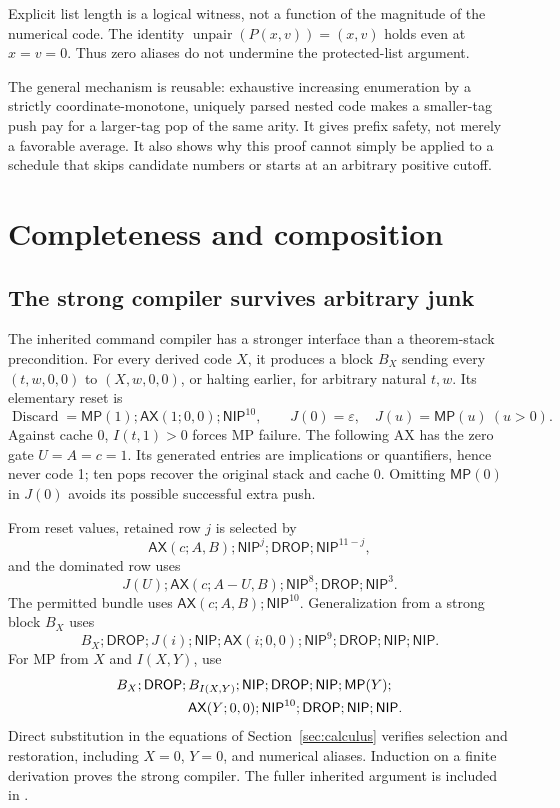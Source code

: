 \documentclass[11pt,a4paper]{article}
\theoremstyle{remark}\newtheorem{remark}[theorem]{Remark}
\newcommand{\D}{\mathsf{DROP}}
\newcommand{\N}{\mathsf{NIP}}
\newcommand{\MP}{\mathsf{MP}}
\newcommand{\AX}{\mathsf{AX}}
\newcommand{\file}[1]{\texttt{\path{#1}}}
\begin{document}
Explicit list length is a logical witness, not a function of the magnitude of the numerical code. The identity $\operatorname{unpair}(P(x,v))=(x,v)$ holds even at $x=v=0$. Thus zero aliases do not undermine the protected-list argument.

The general mechanism is reusable: exhaustive increasing enumeration by a strictly coordinate-monotone, uniquely parsed nested code makes a smaller-tag push pay for a larger-tag pop of the same arity. It gives prefix safety, not merely a favorable average. It also shows why this proof cannot simply be applied to a schedule that skips candidate numbers or starts at an arbitrary positive cutoff.

\section{Completeness and composition}\label{sec:complete}

\subsection{The strong compiler survives arbitrary junk}

The inherited command compiler has a stronger interface than a theorem-stack precondition. For every derived code $X$, it produces a block $B_X$ sending every $(t,w,0,0)$ to $(X,w,0,0)$, or halting earlier, for arbitrary natural $t,w$. Its elementary reset is
\[
 \operatorname{Discard}=\MP(1);\AX(1;0,0);\N^{10},
 \qquad J(0)=\varepsilon,\quad J(u)=\MP(u)\ (u>0).
\]
Against cache 0, $I(t,1)>0$ forces MP failure. The following AX has the zero gate $U=A=c=1$. Its generated entries are implications or quantifiers, hence never code 1; ten pops recover the original stack and cache 0. Omitting $\MP(0)$ in $J(0)$ avoids its possible successful extra push.

From reset values, retained row $j$ is selected by
\[
 \AX(c;A,B);\N^j;\D;\N^{11-j},
\]
and the dominated row uses
\[
 J(U);\AX(c;A-U,B);\N^8;\D;\N^3.
\]
The permitted bundle uses $\AX(c;A,B);\N^{10}$. Generalization from a strong block $B_X$ uses
\[
 B_X;\D;J(i);\N;\AX(i;0,0);\N^9;\D;\N;\N.
\]
For MP from $X$ and $I(X,Y)$, use
\begin{align*}
 &B_X;\D;B_{I(X,Y)};\N;\D;\N;\MP(Y);\\
 &\hspace{18mm}\AX(Y;0,0);\N^{10};\D;\N;\N.
\end{align*}
Direct substitution in the equations of Section~\ref{sec:calculus} verifies selection and restoration, including $X=0$, $Y=0$, and numerical aliases. Induction on a finite derivation proves the strong compiler. The fuller inherited argument is included in \file{reference/command-compiler.md}.
\end{document}

